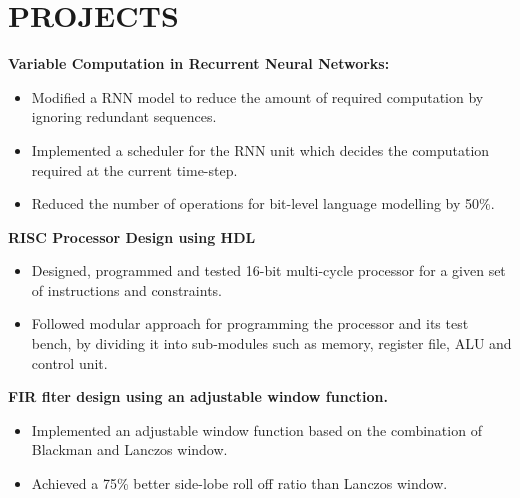 \section{PROJECTS}

{\textbf{Variable Computation in Recurrent Neural Networks:}
    \begin{itemize}
        \item Modified a RNN model to reduce the amount of required computation by ignoring redundant sequences.
        \item Implemented a scheduler for the RNN unit which decides the computation required at the current time-step.
        \item Reduced the number of operations for bit-level language modelling by 50\%.
    \end{itemize}
}

{\textbf{RISC Processor Design using HDL}
    \begin{itemize}
        \item Designed, programmed and tested 16-bit multi-cycle processor for a given set of instructions and constraints.
        \item Followed modular approach for programming the processor and its test bench, by dividing it into sub-modules such as memory, register file, ALU and control unit.
    \end{itemize}
}

{\textbf{FIR flter design using an adjustable window function.}
    \begin{itemize}
        \item Implemented an adjustable window function based on the combination of Blackman and Lanczos window.
        \item Achieved a 75\% better side-lobe roll off ratio than Lanczos window.
    \end{itemize}
}
